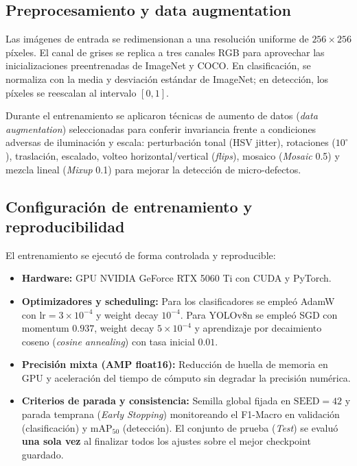 \documentclass[11pt,a4paper]{article}
\begin{document}
\subsection{Preprocesamiento y data augmentation}
Las imágenes de entrada se redimensionan a una resolución uniforme de
$256\times256$ píxeles. El canal de grises se replica a tres canales RGB para
aprovechar las inicializaciones preentrenadas de ImageNet y COCO. En clasificación,
se normaliza con la media y desviación estándar de ImageNet; en detección, los
píxeles se reescalan al intervalo $[0, 1]$.

Durante el entrenamiento se aplicaron técnicas de aumento de datos (\emph{data
augmentation}) seleccionadas para conferir invariancia frente a condiciones adversas
de iluminación y escala: perturbación tonal (HSV jitter), rotaciones ($10^\circ$),
traslación, escalado, volteo horizontal/vertical (\emph{flips}), mosaico (\emph{Mosaic} 0.5)
y mezcla lineal (\emph{Mixup} 0.1) para mejorar la detección de micro-defectos.

\subsection{Configuración de entrenamiento y reproducibilidad}
El entrenamiento se ejecutó de forma controlada y reproducible:
\begin{itemize}[leftmargin=1.6em,itemsep=0.1em]
  \item \textbf{Hardware:} GPU NVIDIA GeForce RTX 5060 Ti con CUDA y PyTorch.
  \item \textbf{Optimizadores y scheduling:} Para los clasificadores se empleó
  AdamW con $\text{lr} = 3\times10^{-4}$ y weight decay $10^{-4}$. Para YOLOv8n se
  empleó SGD con momentum $0.937$, weight decay $5\times10^{-4}$ y aprendizaje por
  decaimiento coseno (\emph{cosine annealing}) con tasa inicial $0.01$.
  \item \textbf{Precisión mixta (AMP float16):} Reducción de huella de memoria en
  GPU y aceleración del tiempo de cómputo sin degradar la precisión numérica.
  \item \textbf{Criterios de parada y consistencia:} Semilla global fijada en
  $\text{SEED}=42$ y parada temprana (\emph{Early Stopping}) monitoreando el F1-Macro
  en validación (clasificación) y $\text{mAP}_{50}$ (detección). El conjunto de
  prueba (\emph{Test}) se evaluó \textbf{una sola vez} al finalizar todos los
  ajustes sobre el mejor checkpoint guardado.
\end{itemize}
\end{document}
